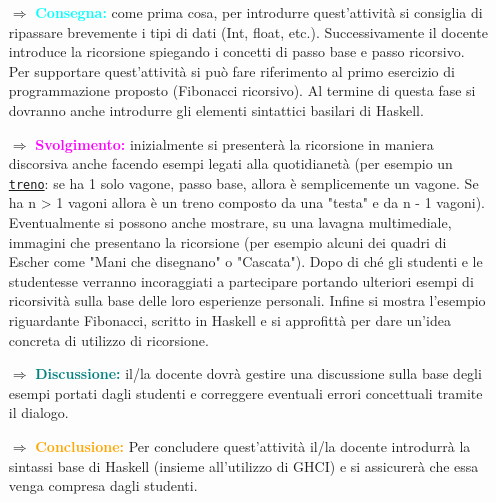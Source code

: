 \begin{itemize}
    \item [$\Rightarrow$] \textbf{\textcolor{cyan}{Consegna:}} come prima cosa, per introdurre
    quest'attività si consiglia di ripassare brevemente i tipi di dati (Int, float, etc.). 
    Successivamente il docente introduce la ricorsione spiegando i concetti di passo base e passo
    ricorsivo. Per supportare quest'attività si può fare riferimento al primo esercizio di programmazione proposto
    (Fibonacci ricorsivo). Al termine di questa fase si dovranno anche introdurre gli elementi sintattici basilari di Haskell.
    \item [$\Rightarrow$] \textbf{\textcolor{magenta}{Svolgimento:}} inizialmente si presenterà la
    ricorsione in maniera discorsiva anche facendo esempi legati alla quotidianetà 
    (per esempio un \texttt{\href{https://www.researchgate.net/publication/309578166_Percorso_didattico_sulla_ricorsione_dalla_natura_al_coding}{treno}}:
    se ha 1 solo vagone, passo base, allora è semplicemente un vagone. Se ha n > 1 vagoni allora
    è un treno composto da una "testa" e da n - 1 vagoni). Eventualmente si possono anche mostrare,
    su una lavagna multimediale, immagini che presentano la ricorsione (per esempio alcuni dei quadri di Escher
    come "Mani che disegnano" o "Cascata"). Dopo di ché gli studenti e le studentesse verranno incoraggiati a partecipare portando
    ulteriori esempi di ricorsività sulla base delle loro esperienze personali.
     Infine si mostra l'esempio riguardante Fibonacci, scritto in Haskell
    e si approfittà per dare un'idea concreta di utilizzo di ricorsione.
    \item [$\Rightarrow$] \textbf{\textcolor{teal}{Discussione:}} il/la docente dovrà gestire una discussione
    sulla base degli esempi portati dagli studenti e correggere eventuali errori concettuali
    tramite il dialogo. 
    \item [$\Rightarrow$] \textbf{\textcolor{orange}{Conclusione:}} Per concludere quest'attività il/la docente introdurrà
    la sintassi base di Haskell (insieme all'utilizzo di GHCI) e si assicurerà che essa venga compresa dagli studenti. 
\end{itemize}


